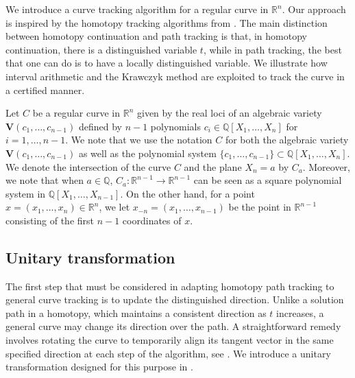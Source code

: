 We introduce a curve tracking algorithm for a regular curve in $\mathbb{R}^n$. Our approach is inspired by the homotopy tracking algorithms from \cite{duff2024certified,guillemot2024validated}.  The main distinction between homotopy continuation and path tracking is that, in homotopy continuation, there is a distinguished variable $t$, while in path tracking, the best that one can do is to have a locally distinguished variable.  We illustrate how interval arithmetic and the Krawczyk method are exploited to track the curve in a certified manner. %

Let $C$ be a regular curve in $\mathbb{R}^n$ given by the real loci of an algebraic variety $\mathbf{V}(c_1,\dots, c_{n-1})$ defined by $n-1$ polynomials $c_i\in \mathbb{Q}[X_1,\dots, X_n]$ for $i=1,\dots, n-1$.  We note that we use the notation $C$ for both the algebraic variety $\mathbf{V}(c_1,\dots,c_{n-1})$ as well as the polynomial system $\{c_1,\dots, c_{n-1}\}\subset\mathbb{Q}[X_1,\dots, X_n]$.  We denote the intersection of the curve $C$ and the plane $X_n=a$ by $C_a$.  Moreover, we note that when $a\in\mathbb{Q}$, $C_a:\mathbb{R}^{n-1}\rightarrow \mathbb{R}^{n-1}$ can be seen as a square polynomial system in $\mathbb{Q}[X_1,\dots, X_{n-1}]$.  On the other hand, for a point $x=(x_1,\dots, x_n)\in\mathbb{R}^n$, we let $x_{-n}=(x_1,\dots, x_{n-1})$ be the point in $\mathbb{R}^{n-1}$ consisting of the first $n-1$ coordinates of $x$.




\subsection{Unitary transformation}

The first step that must be considered in adapting homotopy path tracking to general curve tracking is to update the distinguished direction.  Unlike a solution path in a homotopy, which maintains a consistent direction as $t$ increases, a general curve may change its direction over the path.  A straightforward remedy involves rotating the curve to temporarily align its tangent vector in the same specified direction at each step of the algorithm, see . We introduce a unitary transformation designed for this purpose in .

